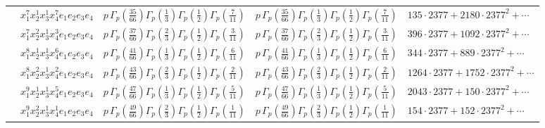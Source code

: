 \documentclass[11pt]{article}
\begin{document}
\begin{table}[ht]
{\begin{tabular}{@{}lllll@{}}
 & $x_{1}^{7} x_{2}^{1} x_{3}^{1} x_{4}^{7}  e_{1} e_{2} e_{3} e_{4}$ & $p \, \Gamma_p \left( \frac{35}{66} \right) \Gamma_p \left( \frac{1}{3} \right) \Gamma_p \left( \frac{1}{2} \right) \Gamma_p \left( \frac{7}{11} \right)$ & $p \, \Gamma_p \left( \frac{35}{66} \right) \Gamma_p \left( \frac{1}{3} \right) \Gamma_p \left( \frac{1}{2} \right) \Gamma_p \left( \frac{7}{11} \right)$ & $135{\cdot}2377{+}2180{\cdot}2377^{2}{+}\cdots$ \\
 & $x_{1}^{7} x_{2}^{2} x_{3}^{1} x_{4}^{3}  e_{1} e_{2} e_{3} e_{4}$ & $p \, \Gamma_p \left( \frac{37}{66} \right) \Gamma_p \left( \frac{2}{3} \right) \Gamma_p \left( \frac{1}{2} \right) \Gamma_p \left( \frac{3}{11} \right)$ & $p \, \Gamma_p \left( \frac{37}{66} \right) \Gamma_p \left( \frac{2}{3} \right) \Gamma_p \left( \frac{1}{2} \right) \Gamma_p \left( \frac{3}{11} \right)$ & $396{\cdot}2377{+}1092{\cdot}2377^{2}{+}\cdots$ \\
 & $x_{1}^{8} x_{2}^{1} x_{3}^{1} x_{4}^{6}  e_{1} e_{2} e_{3} e_{4}$ & $p \, \Gamma_p \left( \frac{41}{66} \right) \Gamma_p \left( \frac{1}{3} \right) \Gamma_p \left( \frac{1}{2} \right) \Gamma_p \left( \frac{6}{11} \right)$ & $p \, \Gamma_p \left( \frac{41}{66} \right) \Gamma_p \left( \frac{1}{3} \right) \Gamma_p \left( \frac{1}{2} \right) \Gamma_p \left( \frac{6}{11} \right)$ & $344{\cdot}2377{+}889{\cdot}2377^{2}{+}\cdots$ \\
 & $x_{1}^{8} x_{2}^{2} x_{3}^{1} x_{4}^{2}  e_{1} e_{2} e_{3} e_{4}$ & $p \, \Gamma_p \left( \frac{43}{66} \right) \Gamma_p \left( \frac{2}{3} \right) \Gamma_p \left( \frac{1}{2} \right) \Gamma_p \left( \frac{2}{11} \right)$ & $p \, \Gamma_p \left( \frac{43}{66} \right) \Gamma_p \left( \frac{2}{3} \right) \Gamma_p \left( \frac{1}{2} \right) \Gamma_p \left( \frac{2}{11} \right)$ & $1264{\cdot}2377{+}1752{\cdot}2377^{2}{+}\cdots$ \\
 & $x_{1}^{9} x_{2}^{1} x_{3}^{1} x_{4}^{5}  e_{1} e_{2} e_{3} e_{4}$ & $p \, \Gamma_p \left( \frac{47}{66} \right) \Gamma_p \left( \frac{1}{3} \right) \Gamma_p \left( \frac{1}{2} \right) \Gamma_p \left( \frac{5}{11} \right)$ & $p \, \Gamma_p \left( \frac{47}{66} \right) \Gamma_p \left( \frac{1}{3} \right) \Gamma_p \left( \frac{1}{2} \right) \Gamma_p \left( \frac{5}{11} \right)$ & $2043{\cdot}2377{+}150{\cdot}2377^{2}{+}\cdots$ \\
 & $x_{1}^{9} x_{2}^{2} x_{3}^{1} x_{4}^{1}  e_{1} e_{2} e_{3} e_{4}$ & $p \, \Gamma_p \left( \frac{49}{66} \right) \Gamma_p \left( \frac{2}{3} \right) \Gamma_p \left( \frac{1}{2} \right) \Gamma_p \left( \frac{1}{11} \right)$ & $p \, \Gamma_p \left( \frac{49}{66} \right) \Gamma_p \left( \frac{2}{3} \right) \Gamma_p \left( \frac{1}{2} \right) \Gamma_p \left( \frac{1}{11} \right)$ & $154{\cdot}2377{+}152{\cdot}2377^{2}{+}\cdots$ \\

\end{tabular}}
\end{table}
\end{document}

